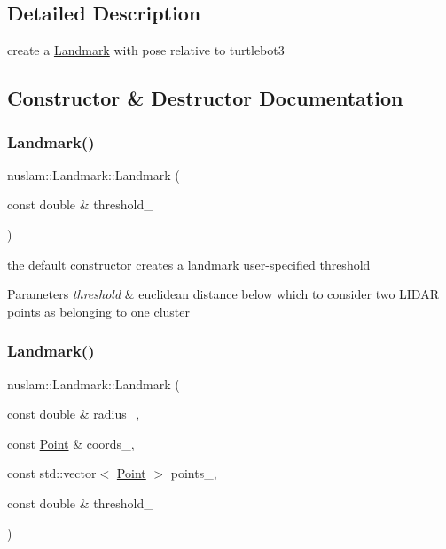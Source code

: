 \subsection{Detailed Description}
create a \hyperlink{classnuslam_1_1Landmark}{Landmark} with pose relative to turtlebot3 

\subsection{Constructor \& Destructor Documentation}
\mbox{\label{classnuslam_1_1Landmark_aa5b87e30cb0f736c128227854a89fa0d}} 
\subsubsection{\texorpdfstring{Landmark()}{Landmark()}\hspace{0.1cm}{\footnotesize\ttfamily [1/2]}}
{\footnotesize\ttfamily nuslam\+::\+Landmark\+::\+Landmark (\begin{DoxyParamCaption}\item[{const double \&}]{threshold\+\_\+ }\end{DoxyParamCaption})}



the default constructor creates a landmark user-\/specified threshold 


\begin{DoxyParams}{Parameters}
{\em threshold} & euclidean distance below which to consider two L\+I\+D\+AR points as belonging to one cluster \\
\hline
\end{DoxyParams}
\mbox{\label{classnuslam_1_1Landmark_a6f72de6e4e763c25800a29e0d1539f04}} 
\subsubsection{\texorpdfstring{Landmark()}{Landmark()}\hspace{0.1cm}{\footnotesize\ttfamily [2/2]}}
{\footnotesize\ttfamily nuslam\+::\+Landmark\+::\+Landmark (\begin{DoxyParamCaption}\item[{const double \&}]{radius\+\_\+,  }\item[{const \hyperlink{structnuslam_1_1Point}{Point} \&}]{coords\+\_\+,  }\item[{const std\+::vector$<$ \hyperlink{structnuslam_1_1Point}{Point} $>$}]{points\+\_\+,  }\item[{const double \&}]{threshold\+\_\+ }\end{DoxyParamCaption})}



